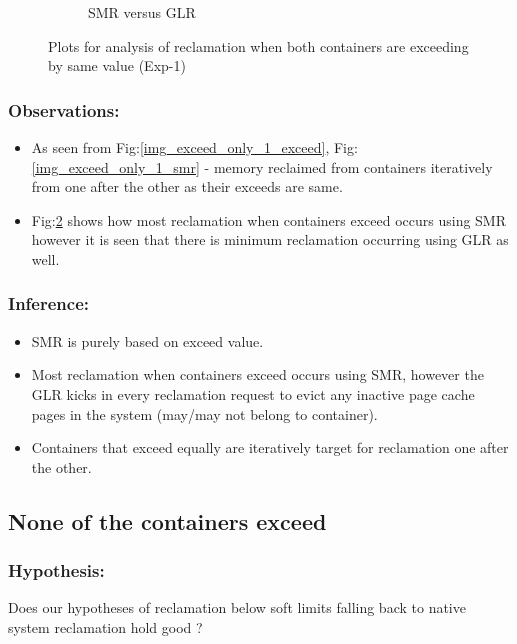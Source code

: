 \begin{figure}[t!]
\begin{subfigure}[t]{0.48\textwidth}
	    \caption{SMR versus GLR}
	  \label{img_exceed_only_1_compare}
	  \end{subfigure}
	  \caption{Plots for analysis of reclamation when both containers are exceeding by same value (Exp-1)}
	\end{figure}
	
	\subsubsection{Observations:}
	
	  \begin{itemize}
	    \item As seen from Fig:\ref{img_exceed_only_1_exceed}, Fig:\ref{img_exceed_only_1_smr} - memory reclaimed from containers 
iteratively from one after the other as their exceeds are same.
	    \item Fig:\ref{img_exceed_only_1_compare} shows how most reclamation when containers exceed occurs using SMR however it is seen 
that there is minimum reclamation occurring using GLR as well.
	  \end{itemize}

	\subsubsection{Inference:}	
	  \begin{itemize}
	    \item SMR is purely based on exceed value.
	    \item Most reclamation when containers exceed occurs using SMR, however the GLR kicks in every reclamation request to evict any 
inactive page cache pages in the system (may/may not belong to container).
	    \item Containers that exceed equally are iteratively target for reclamation one after the other.
	  \end{itemize}

    
    \subsection{None of the containers exceed}
    
    \subsubsection{Hypothesis:}
      Does our hypotheses of reclamation below soft limits falling back to native system reclamation hold good ?
      
